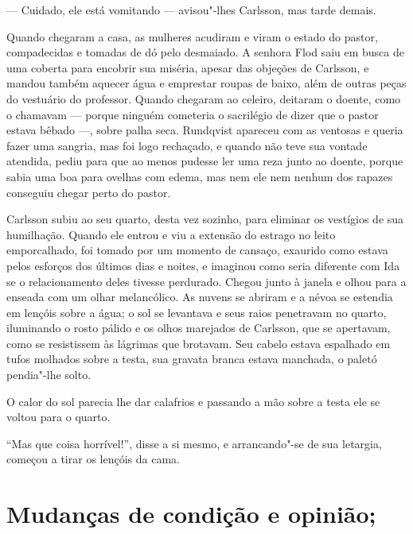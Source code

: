 --- Cuidado, ele está vomitando --- avisou"-lhes Carlsson, mas tarde demais.

Quando chegaram a casa, as mulheres acudiram e viram o estado do pastor, 
compadecidas e tomadas de dó pelo desmaiado. A senhora Flod saiu em busca de uma
coberta para encobrir sua miséria, apesar das objeções de Carlsson, e mandou
também aquecer água e emprestar roupas de baixo, além de outras peças do vestuário
do professor. Quando chegaram ao celeiro, deitaram o doente, como o chamavam
--- porque ninguém cometeria o sacrilégio de dizer que o pastor estava bêbado ---, sobre
palha seca. Rundqvist apareceu com as ventosas e queria fazer uma sangria, mas
foi logo rechaçado, e quando não teve sua vontade atendida, pediu para que ao
menos pudesse ler uma reza junto ao doente, porque sabia uma boa para ovelhas com
edema, mas nem ele nem nenhum dos rapazes conseguiu chegar perto do pastor.

Carlsson subiu ao seu quarto, desta vez sozinho, para eliminar os vestígios de sua
humilhação. Quando ele entrou e viu a extensão do estrago no leito emporcalhado,
foi tomado por um momento de cansaço, exaurido como estava pelos esforços dos
últimos dias e noites, e imaginou como seria diferente com Ida se o
relacionamento deles tivesse perdurado. Chegou junto à janela e olhou para
a enseada com um olhar melancólico. As nuvens se abriram e a névoa se
estendia em lençóis sobre a água; o sol se levantava e seus raios penetravam no quarto,
iluminando o rosto pálido e os olhos marejados de Carlsson, que se apertavam, como
se resistissem às lágrimas que brotavam. Seu cabelo estava espalhado em
tufos molhados sobre a testa, sua gravata branca estava manchada, o paletó
pendia"-lhe solto. 

O calor do sol parecia lhe dar calafrios e passando a
mão sobre a testa ele se voltou para o quarto. 

``Mas que coisa horrível!'', disse a si mesmo, e arrancando"-se 
de sua letargia, começou a tirar os lençóis da cama.

\chapter[Mudanças de condição e opinião\ldots]{Mudanças de condição e opinião; 
}

